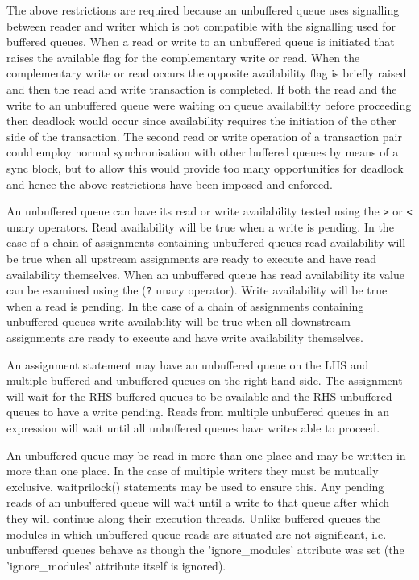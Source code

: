         The above restrictions are required because an unbuffered queue uses
        signalling between reader and writer which is not compatible with the
        signalling used for buffered queues. When a read or write to an
        unbuffered queue is initiated that raises the available flag for the
        complementary write or read. When the complementary write or read occurs
        the opposite availability flag is briefly raised and then the read and
        write transaction is completed. If both the read and the write to an
        unbuffered queue were waiting on queue availability before proceeding
        then deadlock would occur since availability requires the initiation of
        the other side of the transaction. The second read or write operation of
        a transaction pair could employ normal synchronisation with other
        buffered queues by means of a sync block, but to allow this would
        provide too many opportunities for deadlock and hence the above
        restrictions have been imposed and enforced.
        
        An unbuffered queue can have its read or write availability tested using
        the \verb'>' or \verb'<' unary operators. Read availability will be true
        when a write is pending. In the case of a chain of assignments containing
        unbuffered queues read availability will be true when all upstream
        assignments are ready to execute and have read availability themselves.
        When an unbuffered queue has read availability its value can be examined
        using the (\verb'?' unary operator). Write availability will be true when
        a read is pending. In the case of a chain of assignments containing
        unbuffered queues write availability will be true when all downstream
        assignments are ready to execute and have write availability themselves.
        
        An assignment statement may have an unbuffered queue on the LHS and
        multiple buffered and unbuffered queues on the right hand side. The
        assignment will wait for the RHS buffered queues to be available and the
        RHS unbuffered queues to have a write pending. Reads from multiple
        unbuffered queues in an expression will wait until all unbuffered queues
        have writes able to proceed.

        An unbuffered queue may be read in more than one place and may be written
        in more than one place. In the case of multiple writers they must be
        mutually exclusive. waitprilock() statements may be used to ensure this.
        Any pending reads of an unbuffered queue will wait until a write to that
        queue after which they will continue along their execution threads.
        Unlike buffered queues the modules in which unbuffered queue reads are
        situated are not significant, i.e. unbuffered queues behave as though the
        'ignore\_modules' attribute was set (the 'ignore\_modules' attribute
        itself is ignored).

